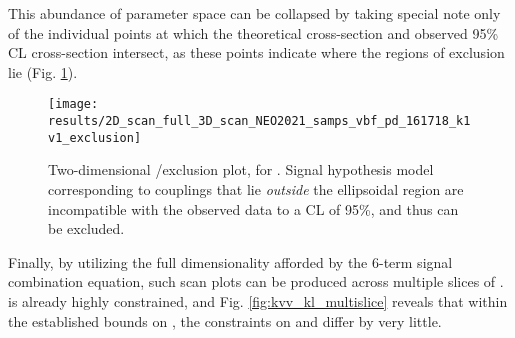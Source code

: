     \FloatBarrier
    This abundance of parameter space can be collapsed by taking special note only of
        the individual points at which the theoretical cross-section and observed 95\% CL cross-section intersect,
        as these points indicate where the regions of exclusion lie (Fig. \ref{fig:kvv_kl_2Dscan}).

    \begin{figure}
        \texttt{[image: results/2D\_scan\_full\_3D\_scan\_NEO2021\_samps\_vbf\_pd\_161718\_k1v1\_exclusion]}
        \caption{Two-dimensional \kvv/\kl exclusion plot, for .
            Signal hypothesis model corresponding to couplings that lie
                \textit{outside} the ellipsoidal region are incompatible with the observed data to a CL of 95\%,
                and thus can be excluded.
            }
        \label{fig:kvv_kl_2Dscan}
    \end{figure}

    Finally, by utilizing the full dimensionality afforded by the 6-term signal combination equation,
        such scan plots can be produced across multiple slices of \kv.
    \kv is already highly constrained, and Fig. \ref{fig:kvv_kl_multislice}
        reveals that within the established bounds on \kv,
        the constraints on \kl and \kvv differ by very little.

